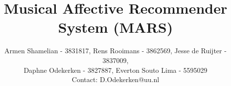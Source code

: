 \documentclass[10pt,journal,compsoc]{IEEEtran}
\begin{document}
%
\title{Musical Affective Recommender System (MARS)}
%
%
%
%

\author{Armen Shamelian - 3831817, Rens Rooimans - 3862569, Jesse de Ruijter - 3837009, \\Daphne Odekerken - 3827887, Everton Souto Lima - 5595029 \\ Contact: D.Odekerken@uu.nl}%

% 
%
\end{document}
